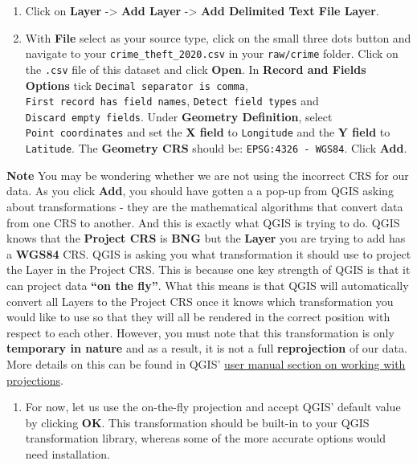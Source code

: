 \documentclass[
]{book}
\providecommand{\tightlist}{%
  \setlength{\itemsep}{0pt}\setlength{\parskip}{0pt}}
\begin{document}
\begin{enumerate}
\def\labelenumi{\arabic{enumi}.}
\item
  Click on \textbf{Layer} -\textgreater{} \textbf{Add Layer} -\textgreater{} \textbf{Add Delimited Text File Layer}.
\item
  With \textbf{File} select as your source type, click on the small three dots button and navigate to your \texttt{crime\_theft\_2020.csv} in your \texttt{raw/crime} folder. Click on the \texttt{.csv} file of this dataset and click \textbf{Open}. In \textbf{Record and Fields Options} tick \texttt{Decimal\ separator\ is\ comma}, \texttt{First\ record\ has\ field\ names}, \texttt{Detect\ field\ types} and \texttt{Discard\ empty\ fields}. Under \textbf{Geometry Definition}, select \texttt{Point\ coordinates} and set the \textbf{X field} to \texttt{Longitude} and the \textbf{Y field} to \texttt{Latitude}. The \textbf{Geometry CRS} should be: \texttt{EPSG:4326\ -\ WGS84}. Click \textbf{Add}.
\end{enumerate}

\textbf{Note}
You may be wondering whether we are not using the incorrect CRS for our data. As you click \textbf{Add}, you should have gotten a a pop-up from QGIS asking about transformations - they are the mathematical algorithms that convert data from one CRS to another. And this is exactly what QGIS is trying to do. QGIS knows that the \textbf{Project CRS} is \textbf{BNG} but the \textbf{Layer} you are trying to add has a \textbf{WGS84} CRS. QGIS is asking you what transformation it should use to project the Layer in the Project CRS. This is because one key strength of QGIS is that it can project data \textbf{``on the fly''}. What this means is that QGIS will automatically convert all Layers to the Project CRS once it knows which transformation you would like to use so that they will all be rendered in the correct position with respect to each other. However, you must note that this transformation is only \textbf{temporary in nature} and as a result, it is not a full \textbf{reprojection} of our data. More details on this can be found in QGIS' \href{https://docs.qgis.org/3.22/en/docs/user_manual/working_with_projections/working_with_projections.html}{user manual section on working with projections}.

\begin{enumerate}
\def\labelenumi{\arabic{enumi}.}
\setcounter{enumi}{2}
\tightlist
\item
  For now, let us use the on-the-fly projection and accept QGIS' default value by clicking \textbf{OK}. This transformation should be built-in to your QGIS transformation library, whereas some of the more accurate options would need installation.
\end{enumerate}
\end{document}
